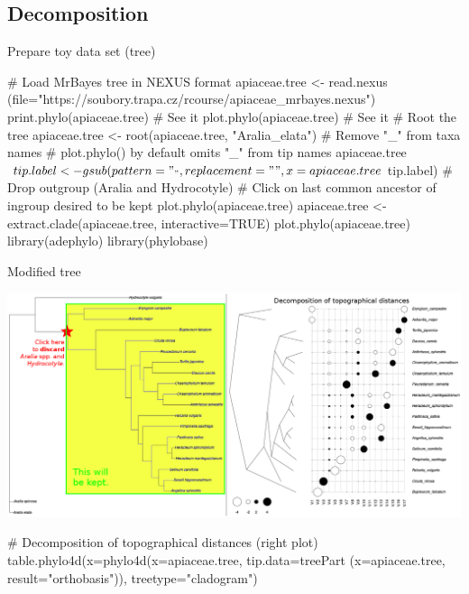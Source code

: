 \documentclass[compress, ucs, xelatex, 11pt, xcolor=svgnames,
  hyperref={
    bookmarks=true,
    unicode=true,
    colorlinks=true,
    pdftitle={Molecular data in R},
    plainpages=false,
    pdfauthor={Vojtech Zeisek},
    pdfsubject={Course about phylogeny and evolution in R},
    pdfcreator={XeLaTeX},
    pdfkeywords={R, evolution, phylogeny, molecular data},
    linkcolor=Tomato,
    anchorcolor=SaddleBrown,
    citecolor=Goldenrod,
    filecolor=DarkMagenta,
    menucolor=Sienna,
    urlcolor=DarkTurquoise,
    pdftex},
  url={hyphens, lowtilde} %
  ]{beamer}
\begin{document}
\subsection{Decomposition}

\begin{frame}[fragile]{Prepare toy data set (tree)}
  \begin{spluscode}
    # Load MrBayes tree in NEXUS format
    apiaceae.tree <- read.nexus
      (file="https://soubory.trapa.cz/rcourse/apiaceae_mrbayes.nexus")
    print.phylo(apiaceae.tree) # See it
    plot.phylo(apiaceae.tree) # See it
    # Root the tree
    apiaceae.tree <- root(apiaceae.tree, "Aralia_elata")
    # Remove "_" from taxa names
    # plot.phylo() by default omits "_" from tip names
    apiaceae.tree$tip.label <- gsub(pattern="_", replacement=" ",
      x=apiaceae.tree$tip.label)
    # Drop outgroup (Aralia and Hydrocotyle)
    # Click on last common ancestor of ingroup desired to be kept
    plot.phylo(apiaceae.tree)
    apiaceae.tree <- extract.clade(apiaceae.tree, interactive=TRUE)
    plot.phylo(apiaceae.tree)
    library(adephylo)
    library(phylobase)
  \end{spluscode}
\end{frame}

\begin{frame}[fragile]{Modified tree}
  \begin{center}
    \includegraphics[width=\textwidth-2cm]{apiaceae_tree.png}
  \end{center}
  \begin{spluscode}
    # Decomposition of topographical distances (right plot)
    table.phylo4d(x=phylo4d(x=apiaceae.tree, tip.data=treePart
      (x=apiaceae.tree, result="orthobasis")), treetype="cladogram")
  \end{spluscode}
\end{frame}
\end{document}
